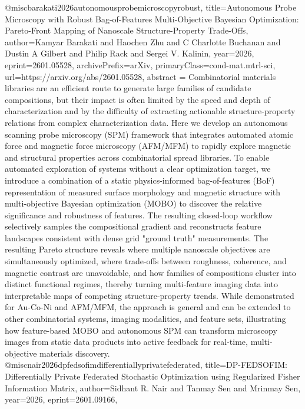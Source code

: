 {}@misc{barakati2026autonomousprobemicroscopyrobust,
      title={Autonomous Probe Microscopy with Robust Bag-of-Features Multi-Objective Bayesian Optimization: Pareto-Front Mapping of Nanoscale Structure-Property Trade-Offs}, 
      author={Kamyar Barakati and Haochen Zhu and C Charlotte Buchanan and Dustin A Gilbert and Philip Rack and Sergei V. Kalinin},
      year={2026},
      eprint={2601.05528},
      archivePrefix={arXiv},
      primaryClass={cond-mat.mtrl-sci},
      url={https://arxiv.org/abs/2601.05528},
      abstract = {Combinatorial materials libraries are an efficient route to generate large families of candidate compositions, but their impact is often limited by the speed and depth of characterization and by the difficulty of extracting actionable structure-property relations from complex characterization data. Here we develop an autonomous scanning probe microscopy (SPM) framework that integrates automated atomic force and magnetic force microscopy (AFM/MFM) to rapidly explore magnetic and structural properties across combinatorial spread libraries. To enable automated exploration of systems without a clear optimization target, we introduce a combination of a static physics-informed bag-of-features (BoF) representation of measured surface morphology and magnetic structure with multi-objective Bayesian optimization (MOBO) to discover the relative significance and robustness of features. The resulting closed-loop workflow selectively samples the compositional gradient and reconstructs feature landscapes consistent with dense grid "ground truth" measurements. The resulting Pareto structure reveals where multiple nanoscale objectives are simultaneously optimized, where trade-offs between roughness, coherence, and magnetic contrast are unavoidable, and how families of compositions cluster into distinct functional regimes, thereby turning multi-feature imaging data into interpretable maps of competing structure-property trends. While demonstrated for Au-Co-Ni and AFM/MFM, the approach is general and can be extended to other combinatorial systems, imaging modalities, and feature sets, illustrating how feature-based MOBO and autonomous SPM can transform microscopy images from static data products into active feedback for real-time, multi-objective materials discovery.}
}@misc{nair2026dpfedsofimdifferentiallyprivatefederated,
      title={DP-FEDSOFIM: Differentially Private Federated Stochastic Optimization using Regularized Fisher Information Matrix}, 
      author={Sidhant R. Nair and Tanmay Sen and Mrinmay Sen},
      year={2026},
      eprint={2601.09166},
}
